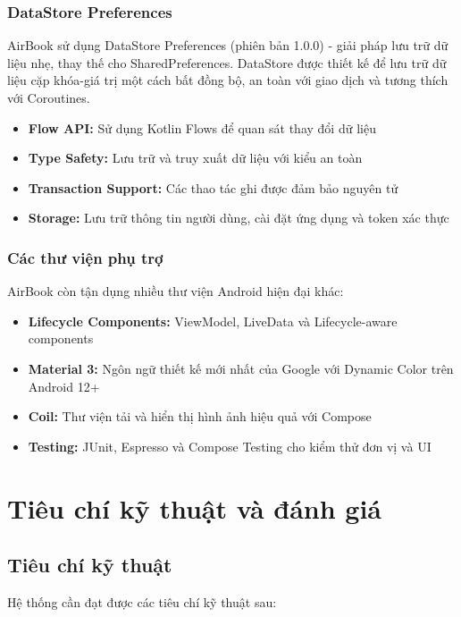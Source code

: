 \subsubsection{DataStore Preferences}

AirBook sử dụng DataStore Preferences (phiên bản 1.0.0) - giải pháp lưu trữ dữ liệu nhẹ, thay thế cho SharedPreferences. DataStore được thiết kế để lưu trữ dữ liệu cặp khóa-giá trị một cách bất đồng bộ, an toàn với giao dịch và tương thích với Coroutines.

\begin{itemize}[leftmargin=1cm]
    \item \textbf{Flow API:} Sử dụng Kotlin Flows để quan sát thay đổi dữ liệu
    \item \textbf{Type Safety:} Lưu trữ và truy xuất dữ liệu với kiểu an toàn
    \item \textbf{Transaction Support:} Các thao tác ghi được đảm bảo nguyên tử
    \item \textbf{Storage:} Lưu trữ thông tin người dùng, cài đặt ứng dụng và token xác thực
\end{itemize}

\subsubsection{Các thư viện phụ trợ}

AirBook còn tận dụng nhiều thư viện Android hiện đại khác:

\begin{itemize}[leftmargin=1cm]
    \item \textbf{Lifecycle Components:} ViewModel, LiveData và Lifecycle-aware components
    \item \textbf{Material 3:} Ngôn ngữ thiết kế mới nhất của Google với Dynamic Color trên Android 12+
    \item \textbf{Coil:} Thư viện tải và hiển thị hình ảnh hiệu quả với Compose
    \item \textbf{Testing:} JUnit, Espresso và Compose Testing cho kiểm thử đơn vị và UI
\end{itemize}

\section{Tiêu chí kỹ thuật và đánh giá}

\subsection{Tiêu chí kỹ thuật}
Hệ thống cần đạt được các tiêu chí kỹ thuật sau:

